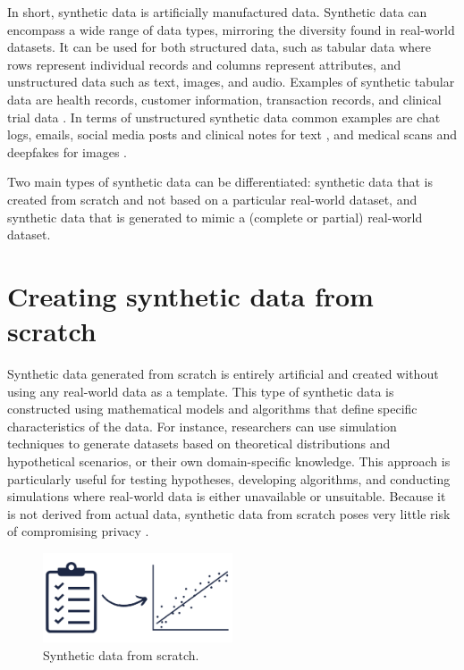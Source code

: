 

\label{syntheticdata}

In short, synthetic data is artificially manufactured data. Synthetic data can encompass a wide range of data types, mirroring the diversity found in real-world datasets. It can be used for both structured data, such as tabular data where rows represent individual records and columns represent attributes, and unstructured data such as text, images, and audio. Examples of synthetic tabular data are health records, customer information, transaction records, and clinical trial data \cite{el2020practical,yan2022multifaceted,hradec2022multipurpose}. In terms of unstructured synthetic data common examples are chat logs, emails, social media posts and clinical notes for text \cite{sagduyu2018synthetic,li2021synthetic}, and medical scans and deepfakes for images \cite{patel2023deepfake,paproki2024synthetic}. 

Two main types of synthetic data can be differentiated: synthetic data that is created from scratch and not based on a particular real-world dataset, and synthetic data that is generated to mimic a (complete or partial) real-world dataset. 

\section{Creating synthetic data from scratch}
Synthetic data generated from scratch is entirely artificial and created without using any real-world data as a template. This type of synthetic data is constructed using mathematical models and algorithms that define specific characteristics of the data. For instance, researchers can use simulation techniques to generate datasets based on theoretical distributions and hypothetical scenarios, or their own domain-specific knowledge. This approach is particularly useful for testing hypotheses, developing algorithms, and conducting simulations where real-world data is either unavailable or unsuitable. Because it is not derived from actual data, synthetic data from scratch poses very little risk of compromising privacy \cite{el2020practical,soltana2017synthetic}. 

\vspace{5pt}
\begin{figure}[h!]
    \centering
    \includegraphics[width=0.5\textwidth]{Images/SyntheticData_1.png}
    \caption{Synthetic data from scratch.}
    \label{fig:sample_image}
\end{figure}
\vspace{5pt}

